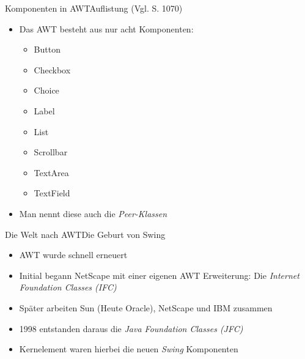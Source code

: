 \begin{frame}{Komponenten in AWT}{Auflistung (Vgl. \cite{ullenboom2018java} S. 1070)}
	\begin{itemize}
		\item Das AWT besteht aus nur acht Komponenten:
		\begin{itemize}
			\item Button
			\item Checkbox
			\item Choice
			\item Label
			\item List
			\item Scrollbar
			\item TextArea
			\item TextField
		\end{itemize}
		\item Man nennt diese auch die \textit{Peer-Klassen}
	\end{itemize}
\end{frame}

\begin{frame}{Die Welt nach AWT}{Die Geburt von Swing}
	\begin{itemize}
		\item AWT wurde schnell erneuert
		\item Initial begann NetScape mit einer eigenen AWT Erweiterung: Die \textit{Internet Foundation Classes (IFC)}
		\item Später arbeiten Sun (Heute Oracle), NetScape und IBM zusammen
		\item 1998 entstanden daraus die \textit{Java Foundation Classes (JFC)}
		\item Kernelement waren hierbei die neuen \textit{Swing} Komponenten
	\end{itemize}
\end{frame}

